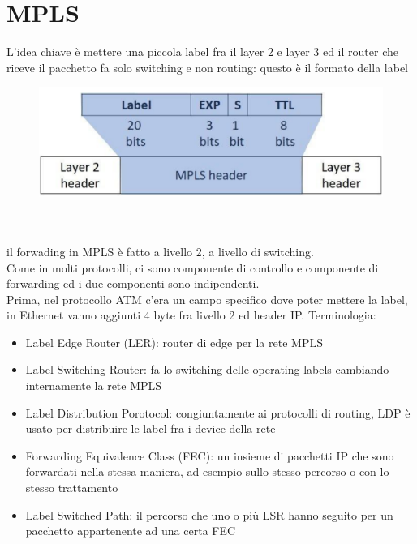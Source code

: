 \documentclass[12pt, oneside]{extbook} %
\begin{document}
\section{MPLS}
L'idea chiave è mettere una piccola label fra il layer 2 e layer 3 ed il router che riceve il pacchetto fa solo switching e non routing: questo è il formato della label\\
\begin{figure}[h!]
    \centering
    \includegraphics[scale=0.5]{../../immagini/mpls_label}
\end{figure}\\\\
il forwading in MPLS è fatto a livello 2, a livello di switching.
\\Come in molti protocolli, ci sono componente di controllo e componente di forwarding ed i due componenti sono indipendenti.
\\Prima, nel protocollo ATM c'era un campo specifico dove poter mettere la label, in Ethernet vanno aggiunti 4 byte fra livello 2 ed header IP. Terminologia:
\begin{itemize}
    \item Label Edge Router (LER): router di edge per la rete MPLS
    \item Label Switching Router: fa lo switching delle operating labels cambiando internamente la rete MPLS  
    \item Label Distribution Porotocol: congiuntamente ai protocolli di routing, LDP è usato per distribuire le label fra i device della rete
    \item Forwarding Equivalence Class (FEC): un insieme di pacchetti IP che sono forwardati nella stessa maniera, ad esempio sullo stesso percorso o con lo stesso trattamento
    \item Label Switched Path: il percorso che uno o più LSR hanno seguito per un pacchetto appartenente ad una certa FEC 
\end{itemize}
\end{document}
